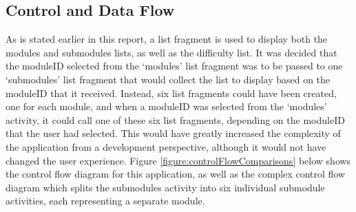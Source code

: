\documentclass{article}
\begin{document}
\subsection{Control and Data Flow}

As is stated earlier in this report, a list fragment is used to display both the modules and submodules lists, as well as the difficulty list. It was decided that the moduleID selected from the `modules' list fragment was to be passed to one `submodules' list fragment that would collect the list to display based on the moduleID that it received. Instead, six list fragments could have been created, one for each module, and when a moduleID was selected from the `modules' activity, it could call one of these six list fragments, depending on the moduleID that the user had selected. This would have greatly increased the complexity of the application from a development perspective, although it would not have changed the user experience. Figure \ref{figure:controlFlowComparisons} below shows the control flow diagram for this application, as well as the complex control flow diagram which splits the submodules activity into six individual submodule activities, each representing a separate module.
\end{document}
